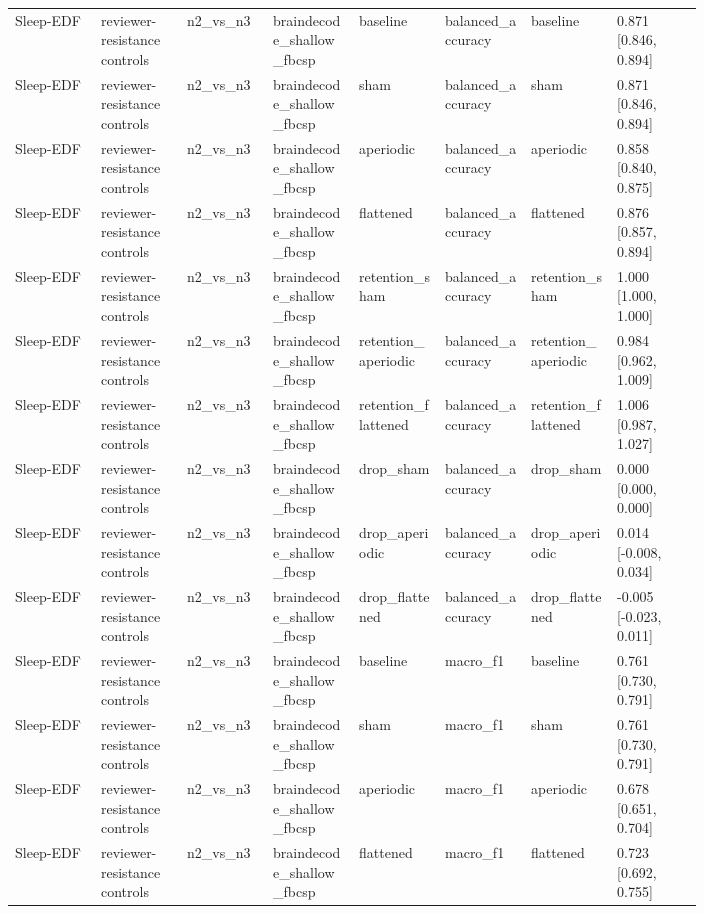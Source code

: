 \begin{longtable}{p{0.10\linewidth}p{0.10\linewidth}p{0.10\linewidth}p{0.10\linewidth}p{0.10\linewidth}p{0.10\linewidth}p{0.10\linewidth}p{0.10\linewidth}}
Sleep-EDF & reviewer-resistance controls & n2\_vs\_n3 & braindecode\_shallow\_fbcsp & baseline & balanced\_accuracy & baseline & 0.871 [0.846, 0.894]\\
Sleep-EDF & reviewer-resistance controls & n2\_vs\_n3 & braindecode\_shallow\_fbcsp & sham & balanced\_accuracy & sham & 0.871 [0.846, 0.894]\\
Sleep-EDF & reviewer-resistance controls & n2\_vs\_n3 & braindecode\_shallow\_fbcsp & aperiodic & balanced\_accuracy & aperiodic & 0.858 [0.840, 0.875]\\
Sleep-EDF & reviewer-resistance controls & n2\_vs\_n3 & braindecode\_shallow\_fbcsp & flattened & balanced\_accuracy & flattened & 0.876 [0.857, 0.894]\\
Sleep-EDF & reviewer-resistance controls & n2\_vs\_n3 & braindecode\_shallow\_fbcsp & retention\_sham & balanced\_accuracy & retention\_sham & 1.000 [1.000, 1.000]\\
Sleep-EDF & reviewer-resistance controls & n2\_vs\_n3 & braindecode\_shallow\_fbcsp & retention\_aperiodic & balanced\_accuracy & retention\_aperiodic & 0.984 [0.962, 1.009]\\
Sleep-EDF & reviewer-resistance controls & n2\_vs\_n3 & braindecode\_shallow\_fbcsp & retention\_flattened & balanced\_accuracy & retention\_flattened & 1.006 [0.987, 1.027]\\
Sleep-EDF & reviewer-resistance controls & n2\_vs\_n3 & braindecode\_shallow\_fbcsp & drop\_sham & balanced\_accuracy & drop\_sham & 0.000 [0.000, 0.000]\\
Sleep-EDF & reviewer-resistance controls & n2\_vs\_n3 & braindecode\_shallow\_fbcsp & drop\_aperiodic & balanced\_accuracy & drop\_aperiodic & 0.014 [-0.008, 0.034]\\
Sleep-EDF & reviewer-resistance controls & n2\_vs\_n3 & braindecode\_shallow\_fbcsp & drop\_flattened & balanced\_accuracy & drop\_flattened & -0.005 [-0.023, 0.011]\\
Sleep-EDF & reviewer-resistance controls & n2\_vs\_n3 & braindecode\_shallow\_fbcsp & baseline & macro\_f1 & baseline & 0.761 [0.730, 0.791]\\
Sleep-EDF & reviewer-resistance controls & n2\_vs\_n3 & braindecode\_shallow\_fbcsp & sham & macro\_f1 & sham & 0.761 [0.730, 0.791]\\
Sleep-EDF & reviewer-resistance controls & n2\_vs\_n3 & braindecode\_shallow\_fbcsp & aperiodic & macro\_f1 & aperiodic & 0.678 [0.651, 0.704]\\
Sleep-EDF & reviewer-resistance controls & n2\_vs\_n3 & braindecode\_shallow\_fbcsp & flattened & macro\_f1 & flattened & 0.723 [0.692, 0.755]\\

\end{longtable}
